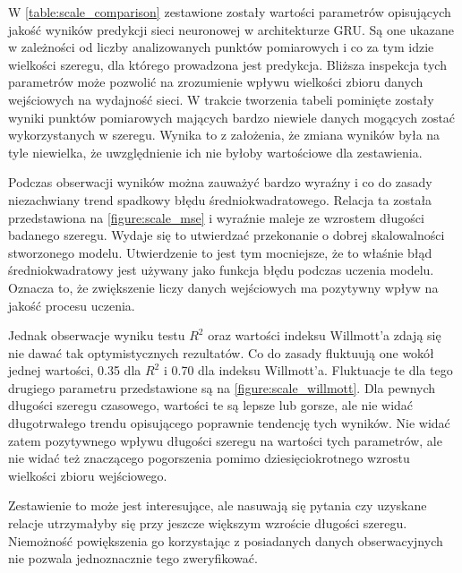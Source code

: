 \documentclass[10pt,a4paper]{article}
\begin{document}
W \autoref{table:scale_comparison} zestawione zostały wartości parametrów opisujących jakość wyników predykcji sieci neuronowej w architekturze GRU. Są one ukazane w zależności od liczby analizowanych punktów pomiarowych i co za tym idzie wielkości szeregu, dla którego prowadzona jest predykcja. Bliższa inspekcja tych parametrów może pozwolić na zrozumienie wpływu wielkości zbioru danych wejściowych na wydajność sieci. W trakcie tworzenia tabeli pominięte zostały wyniki punktów pomiarowych mających bardzo niewiele danych mogących zostać wykorzystanych w szeregu. Wynika to z założenia, że zmiana wyników była na tyle niewielka, że uwzględnienie ich nie byłoby wartościowe dla zestawienia. 

Podczas obserwacji wyników można zauważyć bardzo wyraźny i co do zasady niezachwiany trend spadkowy błędu średniokwadratowego. Relacja ta została przedstawiona na \autoref{figure:scale_mse} i wyraźnie maleje ze wzrostem długości badanego szeregu. Wydaje się to utwierdzać przekonanie o dobrej skalowalności stworzonego modelu. Utwierdzenie to jest tym mocniejsze, że to właśnie błąd średniokwadratowy jest używany jako funkcja błędu podczas uczenia modelu. Oznacza to, że zwiększenie liczy danych wejściowych ma pozytywny wpływ na jakość procesu uczenia. 

Jednak obserwacje wyniku testu $R^2$ oraz wartości indeksu Willmott'a zdają się nie dawać tak optymistycznych rezultatów. Co do zasady fluktuują one wokół jednej wartości, 0.35 dla $R^2$ i 0.70 dla indeksu Willmott'a. Fluktuacje te dla tego drugiego parametru przedstawione są na \autoref{figure:scale_willmott}. Dla pewnych długości szeregu czasowego, wartości te są lepsze lub gorsze, ale nie widać długotrwałego trendu opisującego poprawnie tendencję tych wyników. Nie widać zatem pozytywnego wpływu długości szeregu na wartości tych parametrów, ale nie widać też znaczącego pogorszenia pomimo dziesięciokrotnego wzrostu wielkości zbioru wejściowego. 

Zestawienie to może jest interesujące, ale nasuwają się pytania czy uzyskane relacje utrzymałyby się przy jeszcze większym wzroście długości szeregu. Niemożność powiększenia go korzystając z posiadanych danych obserwacyjnych nie pozwala jednoznacznie tego zweryfikować. 
\end{document}
